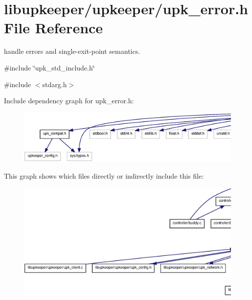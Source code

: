 \section{libupkeeper/upkeeper/upk\_\-error.h File Reference}
\label{upk__error_8h}


handle errors and single-\/exit-\/point semantics.  


{\ttfamily \#include \char`\"{}upk\_\-std\_\-include.h\char`\"{}}\par
{\ttfamily \#include $<$stdarg.h$>$}\par
Include dependency graph for upk\_\-error.h:
\nopagebreak
\begin{figure}[H]
\begin{center}
\leavevmode
\includegraphics[width=400pt]{upk__error_8h__incl}
\end{center}
\end{figure}
This graph shows which files directly or indirectly include this file:\nopagebreak
\begin{figure}[H]
\begin{center}
\leavevmode
\includegraphics[width=400pt]{upk__error_8h__dep__incl}
\end{center}
\end{figure}
